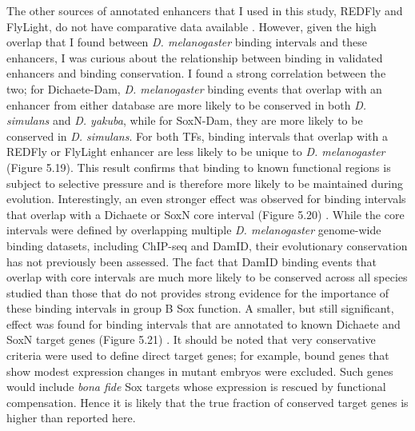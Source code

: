 The other sources of annotated enhancers that I used in this study, REDFly and FlyLight, do not have comparative data available \citep{gallo_redfly_2010,manning_resource_2012}. However, given the high overlap that I found between \emph{D. melanogaster} binding intervals and these enhancers, I was curious about the relationship between binding in validated enhancers and binding conservation. I found a strong correlation between the two; for Dichaete-Dam, \emph{D. melanogaster} binding events that overlap with an enhancer from either database are more likely to be conserved in both \emph{D. simulans} and \emph{D. yakuba}, while for SoxN-Dam, they are more likely to be conserved in \emph{D. simulans}. For both TFs, binding intervals that overlap with a REDFly or FlyLight enhancer are less likely to be unique to \emph{D. melanogaster} (Figure 5.19). This result confirms that binding to known functional regions is subject to selective pressure and is therefore more likely to be maintained during evolution. Interestingly, an even stronger effect was observed for binding intervals that overlap with a Dichaete or SoxN core interval (Figure 5.20) \citep{aleksic_role_2013,ferrero_soxneuro_2014}. While the core intervals were defined by overlapping multiple \emph{D. melanogaster} genome-wide binding datasets, including ChIP-seq and DamID, their evolutionary conservation has not previously been assessed. The fact that DamID binding events that overlap with core intervals are much more likely to be conserved across all species studied than those that do not provides strong evidence for the importance of these binding intervals in group B Sox function. A smaller, but still significant, effect was found for binding intervals that are annotated to known Dichaete and SoxN target genes (Figure 5.21) \citep{aleksic_role_2013,ferrero_soxneuro_2014}. It should be noted that very conservative criteria were used to define direct target genes; for example, bound genes that show modest expression changes in mutant embryos were excluded. Such genes would include \emph{bona fide} Sox targets whose expression is rescued by functional compensation. Hence it is likely that the true fraction of conserved target genes is higher than reported here.\\

